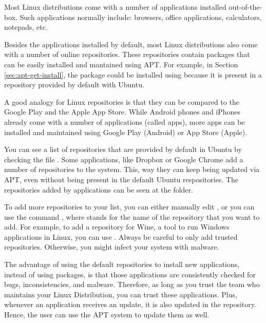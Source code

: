 \begin{my_box}[Repositories]
\label{box:repositories}

Most Linux distributions come with a number of applications installed out-of-the-box. Such applications normally include: browsers, office applications, calculators, notepads, etc.

Besides the applications installed by default, most Linux distributions also come with a number of online repositories. These repositories contain packages that can be easily installed and mantained using \acs{APT}. For example, in  Section \ref{sec:apt-get-install}, the package  could be installed using  because it is present in a repository provided by default with Ubuntu.

A good analogy for Linux repositories is that they can be compared to the  Google Play and the Apple App Store. While Android phones and iPhones already come with a number of applications (called apps), more apps can be installed and maintained using Google Play (Android) or App Store (Apple).

You can see a list of repositories that are provided by default in Ubuntu by checking the file . Some applications, like Dropbox or Google Chrome add a number of repositories to the system. This, way they can keep being updated via \acs{APT}, even without being present in the default Ubuntu respositories. The repositories added by applications can be seen at the  folder.

To add more repositories to your list, you can either manually edit , or you can use the command , where  stands for the name of the repository that you want to add. For example, to add a repository for Wine, a tool to run Windows applications in Linux, you can use . Always be careful to only add trusted repositories. Otherwise, you might infect your system with malware.

The advantage of using the default repositories to install new applications, instead of using  packages, is that those applications are consistently checked for bugs, inconsistencies, and malware. Therefore, as long as you trust the team who maintains your Linux Distribution, you can trust these applications. Plus, whenever an application receives an update, it is also updated in the repository. Hence, the user can use the \acs{APT} system to update them as well.
\end{my_box}

